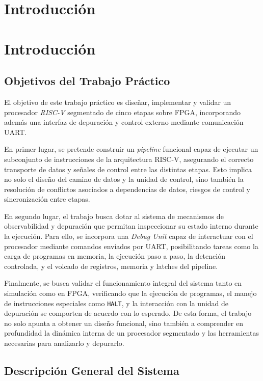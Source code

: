 \section{Introducción}

\section{Introducción}

\subsection{Objetivos del Trabajo Práctico}

El objetivo de este trabajo práctico es diseñar, implementar y validar un procesador \textit{RISC-V} segmentado de cinco etapas sobre FPGA, incorporando además una interfaz de depuración y control externo mediante comunicación UART. 

En primer lugar, se pretende construir un \textit{pipeline} funcional capaz de ejecutar un subconjunto de instrucciones de la arquitectura RISC-V, asegurando el correcto transporte de datos y señales de control entre las distintas etapas. Esto implica no solo el diseño del camino de datos y la unidad de control, sino también la resolución de conflictos asociados a dependencias de datos, riesgos de control y sincronización entre etapas.

En segundo lugar, el trabajo busca dotar al sistema de mecanismos de observabilidad y depuración que permitan inspeccionar su estado interno durante la ejecución. Para ello, se incorpora una \textit{Debug Unit} capaz de interactuar con el procesador mediante comandos enviados por UART, posibilitando tareas como la carga de programas en memoria, la ejecución paso a paso, la detención controlada, y el volcado de registros, memoria y latches del pipeline.

Finalmente, se busca validar el funcionamiento integral del sistema tanto en simulación como en FPGA, verificando que la ejecución de programas, el manejo de instrucciones especiales como \texttt{HALT}, y la interacción con la unidad de depuración se comporten de acuerdo con lo esperado. De esta forma, el trabajo no solo apunta a obtener un diseño funcional, sino también a comprender en profundidad la dinámica interna de un procesador segmentado y las herramientas necesarias para analizarlo y depurarlo.

\subsection{Descripción General del Sistema}

